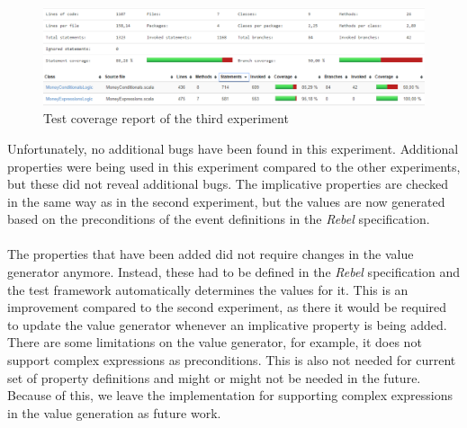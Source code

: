 \FloatBarrier
\begin{figure}[!ht]
	\includegraphics[width=\linewidth]{figures/eval_e3}
\caption{Test coverage report of the third experiment}
\label{fig:experiment2_eval_e2}
\centering
\end{figure}
\FloatBarrier

Unfortunately, no additional bugs have been found in this experiment. Additional properties were being used in this experiment compared to the other experiments, but these did not reveal additional bugs. The implicative properties are checked in the same way as in the second experiment, but the values are now generated based on the preconditions of the event definitions in the \textit{Rebel} specification.\\
\\
The properties that have been added did not require changes in the value generator anymore. Instead, these had to be defined in the \textit{Rebel} specification and the test framework automatically determines the values for it. This is an improvement compared to the second experiment, as there it would be required to update the value generator whenever an implicative property is being added. There are some limitations on the value generator, for example, it does not support complex expressions as preconditions. This is also not needed for current set of property definitions and might or might not be needed in the future. Because of this, we leave the implementation for supporting complex expressions in the value generation as future work.


